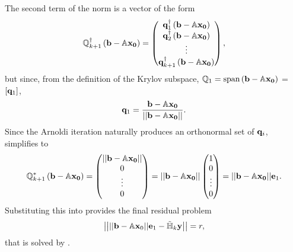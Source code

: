 The second term of the norm is a vector of the form 
\begin{equation}\label{eq:QS}
\mathbb{Q}^{\dagger}_{k+1}\left ( \mathbf{b}-\mathbb{A}\mathbf{x_0} \right ) = \begin{pmatrix} \mathbf{q}^\dagger_1\left ( \mathbf{b}-\mathbb{A}\mathbf{x_0} \right ) \\ \mathbf{q}_2^\dagger\left ( \mathbf{b}-\mathbb{A}\mathbf{x_0} \right ) \\  \vdots \\ \mathbf{q}_{k+1}^\dagger\left ( \mathbf{b}-\mathbb{A}\mathbf{x_0} \right )  \end{pmatrix},
\end{equation}
but since, from the definition of the Krylov subspace, $\mathbb{Q}_1 = \textrm{span}\left ( \mathbf{b}-\mathbb{A}\mathbf{x_0} \right )$ = $[\mathbf{q}_1]$, 
\begin{equation}
\mathbf{q}_1 = \dfrac{\mathbf{b}-\mathbb{A}\mathbf{x_0}}{||\mathbf{b}-\mathbb{A}\mathbf{x_0}||}.
\end{equation}
Since the Arnoldi iteration naturally produces an orthonormal set of $\mathbf{q}_i$,  simplifies to 
\begin{equation}
 \mathbb{Q}^*_{k+1}\left ( \mathbf{b}-\mathbb{A}\mathbf{x_0} \right ) = \begin{pmatrix} ||\mathbf{b}-\mathbb{A}\mathbf{x_0}|| \\ 0 \\  \vdots \\ 0 \end{pmatrix} =  ||\mathbf{b}-\mathbb{A}\mathbf{x_0}|| \begin{pmatrix}1 \\ 0 \\  \vdots \\ 0 \end{pmatrix} =  ||\mathbf{b}-\mathbb{A}\mathbf{x_0}|| \mathbf{e}_1.
\end{equation}
Substituting this into  provides the final residual problem
\begin{equation}\label{eq:GMRESMIN}
\left |\left| {||\mathbf{b} - \mathbb{A}\mathbf{x}_0||}\mathbf{e}_1 - \mathbb{\tilde{H}}_k \mathbf{y} \right |\right| = r,
\end{equation}
that is solved by .

